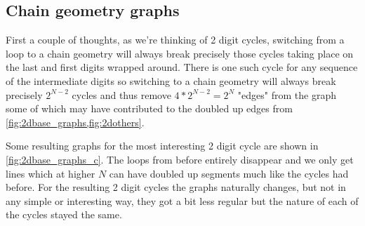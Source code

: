\documentclass[11pt]{article}
\theoremstyle{nothm}
\begin{document}
\subsection{Chain geometry graphs}
First a couple of thoughts, as we're thinking of 2 digit cycles, switching from a loop to a chain geometry will always break precisely those cycles taking place on the last and first digits wrapped around.
There is one such cycle for any sequence of the intermediate digits so switching to a chain geometry will always break precisely $2^{N-2}$ cycles and thus remove $4*2^{N-2}=2^N$ "edges" from the graph some of which may have contributed to the doubled up edges from \cref{fig:2dbase_graphs,fig:2dothers}.

Some resulting graphs for the most interesting 2 digit cycle are shown in \cref{fig:2dbase_graphs_c}.
The loops from before entirely disappear and we only get lines which at higher $N$ can have doubled up segments much like the cycles had before.
For the resulting 2 digit cycles the graphs naturally changes, but not in any simple or interesting way, they got a bit less regular but the nature of each of the cycles stayed the same.
\end{document}
